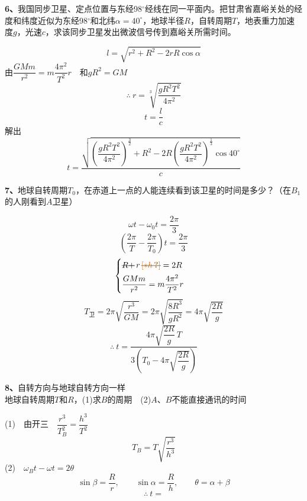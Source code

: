 \begin{problem}[6]
\textbf{6、}我国同步卫星、定点位置与东经98$^\circ$经线在同一平面内。把甘肃省嘉峪关处的经度和纬度近似为东经98$^\circ$和北纬$\alpha=40^\circ$，地球半径$R$，自转周期$T$，地表重力加速度$g$，光速$c$，求该同步卫星发出微波信号传到嘉峪关所需时间。%
\begin{solution}
\[ l=\sqrt{r^2+R^2-2rR\cos\alpha} \]
由$\dfrac{GMm}{r^2}=m\dfrac{4\pi^2}{T^2}r$　和$gR^2=GM$
\[ \therefore\ r=\sqrt[3]{\dfrac{gR^2T^2}{4\pi^2}} \]
\[ t=\dfrac{l}{c} \]
解出
\[ t=\dfrac{\sqrt{\left(\dfrac{gR^2T^2}{4\pi^2}\right)^{\frac{3}{2}}+R^2-2R\left(\dfrac{gR^2T^2}{4\pi^2}\right)^{\frac{1}{3}}\cos 40^\circ}}{c} \] %
\end{solution}
\end{problem}
\begin{problem}[7]
\textbf{7、}地球自转周期$T_0$，在赤道上一点的人能连续看到该卫星的时间是多少？（在$B_1$的人刚看到$A$卫星）
\begin{solution}
\[ \omega t-\omega_0 t=\dfrac{2\pi}{3} \]
\[ \left(\dfrac{2\pi}{T}-\dfrac{2\pi}{T_0}\right)t=\dfrac{2\pi}{3} \]
\[ \begin{cases}
\text{\struck{$R+$}}\,r\,\text{\struck{\unclear{$\ast h$}}}=2R\\[4pt]
\dfrac{GMm}{r^2}=m\dfrac{4\pi^2}{T^2}r
\end{cases} \] %
\[ T_{\text{卫}}=2\pi\sqrt{\dfrac{r^3}{GM}}=2\pi\sqrt{\dfrac{8R^3}{gR^2}}=4\pi\sqrt{\dfrac{2R}{g}} \] %
\noindent{} %
\[ \therefore\ t=\dfrac{4\pi\sqrt{\dfrac{2R}{g}}\,T}{3\left(T_0-4\pi\sqrt{\dfrac{2R}{g}}\right)} \] %
\end{solution}
\end{problem}
\begin{problem}[8]
\textbf{8、}自转方向与地球自转方向一样\\
地球自转周期$T$和$R$，(1)求$B$的周期　(2)$A$、$B$不能直接通讯的时间%
\begin{solution}
(1)　由开三　$\dfrac{r^3}{T_B^2}=\dfrac{h^3}{T^2}$
\[ T_B=T\sqrt{\dfrac{r^3}{h^3}} \]
(2)　$\omega_B t-\omega t=2\theta$
\[ \sin\beta=\dfrac{R}{r},\qquad \sin\alpha=\dfrac{R}{h},\qquad \theta=\alpha+\beta \]
\[ \therefore\ t= \]
\end{solution}
\end{problem}
